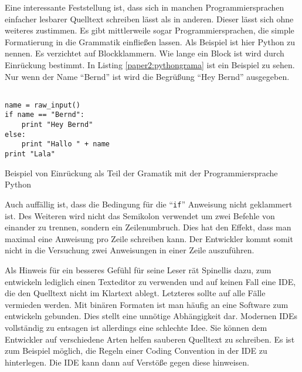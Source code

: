 Eine interessante Feststellung ist, dass sich in manchen Programmiersprachen einfacher lesbarer Quelltext schreiben lässt als in anderen. Dieser lässt sich ohne weiteres zustimmen. Es gibt mittlerweile sogar Programmiersprachen, die simple Formatierung in die Grammatik einfließen lassen. Als Beispiel ist hier Python zu nennen. Es verzichtet auf Blockklammern. Wie lange ein Block ist wird durch Einrückung bestimmt. In Listing \ref{paper2:pythongrama} ist ein Beispiel zu sehen. Nur wenn der Name \enquote{Bernd} ist wird die Begrüßung \enquote{Hey Bernd} ausgegeben.

\begin{listing}[H]
    \begin{verbatim}
    
name = raw_input()
if name == "Bernd":
    print "Hey Bernd"
else:
    print "Hallo " + name
print "Lala"
	\end{verbatim}
    \label{paper2:pythongrama}
    \caption{Beispiel von Einrückung als Teil der Gramatik mit der Programmiersprache Python}
\end{listing}


Auch auffällig ist, dass die Bedingung für die \enquote{\texttt{if}} Anweisung nicht geklammert ist. Des Weiteren wird nicht das Semikolon verwendet um zwei Befehle von einander zu trennen, sondern ein Zeilenumbruch. Dies hat den Effekt, dass man maximal eine Anweisung pro Zeile schreiben kann. Der Entwickler kommt somit nicht in die Versuchung zwei Anweisungen in einer Zeile auszuführen.

Als Hinweis für ein besseres Gefühl für seine Leser rät Spinellis dazu, zum entwickeln lediglich einen Texteditor zu verwenden und auf keinen Fall eine IDE, die den Quelltext nicht im Klartext ablegt. Letzteres sollte auf alle Fälle vermieden werden. Mit binären Formaten ist man häufig an eine Software zum entwickeln gebunden. Dies stellt eine unnötige Abhängigkeit dar. Modernen IDEs vollständig zu entsagen ist allerdings eine schlechte Idee. Sie können dem Entwickler auf verschiedene Arten helfen sauberen Quelltext zu schreiben. Es ist zum Beispiel möglich, die Regeln einer Coding Convention in der IDE zu hinterlegen. Die IDE kann dann auf Verstöße gegen diese hinweisen.


